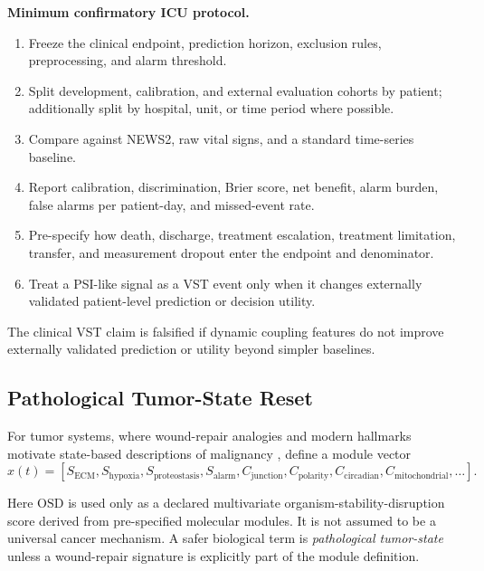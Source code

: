 \documentclass[11pt,a4paper]{article}
\newcommand{\OSD}{\ensuremath{\mathrm{OSD}}}
\newcommand{\1}{\mathbf{1}}
\begin{document}
\noindent\textbf{Minimum confirmatory ICU protocol.}
\begin{enumerate}
  \item Freeze the clinical endpoint, prediction horizon, exclusion rules, preprocessing, and alarm threshold.
  \item Split development, calibration, and external evaluation cohorts by patient; additionally split by hospital, unit, or time period where possible.
  \item Compare against NEWS2, raw vital signs, and a standard time-series baseline.
  \item Report calibration, discrimination, Brier score, net benefit, alarm burden, false alarms per patient-day, and missed-event rate.
  \item Pre-specify how death, discharge, treatment escalation, treatment limitation, transfer, and measurement dropout enter the endpoint and denominator.
  \item Treat a PSI-like signal as a VST event only when it changes externally validated patient-level prediction or decision utility.
\end{enumerate}

The clinical VST claim is falsified if dynamic coupling features do not improve externally validated prediction or utility beyond simpler baselines.

\subsection{Pathological Tumor-State Reset}

For tumor systems, where wound-repair analogies and modern hallmarks motivate state-based descriptions of malignancy \cite{dvorak1986,hanahan2011,hanahan2022}, define a module vector
\[
  x(t)=
  [S_{\mathrm{ECM}},S_{\mathrm{hypoxia}},S_{\mathrm{proteostasis}},S_{\mathrm{alarm}},
  C_{\mathrm{junction}},C_{\mathrm{polarity}},C_{\mathrm{circadian}},C_{\mathrm{mitochondrial}},\ldots].
\]

Here \OSD{} is used only as a declared multivariate organism-stability-disruption score derived from pre-specified molecular modules. It is not assumed to be a universal cancer mechanism. A safer biological term is \emph{pathological tumor-state} unless a wound-repair signature is explicitly part of the module definition.
\end{document}
